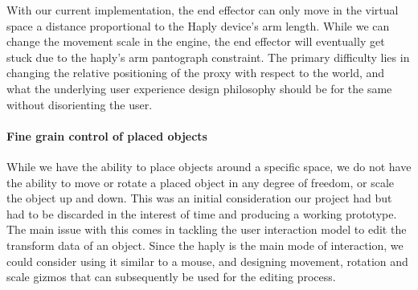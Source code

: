 With our current implementation, the end effector can only move in the virtual space a distance proportional to the Haply device's arm length. While we can change the movement scale in the engine, the end effector will eventually get stuck due to the haply's arm pantograph constraint. The primary difficulty lies in changing the relative positioning of the proxy with respect to the world, and what the underlying user experience design philosophy should be for the same without disorienting the user. 

\paragraph{Fine grain control of placed objects}
While we have the ability to place objects around a specific space, we do not have the ability to move or rotate a placed object in any degree of freedom, or scale the object up and down. This was an initial consideration our project had but had to be discarded in the interest of time and producing a working prototype. The main issue with this comes in tackling the user interaction model to edit the transform data of an object. Since the haply is the main mode of interaction, we could consider using it similar to a mouse, and designing movement, rotation and scale gizmos that can subsequently be used for the editing process.


